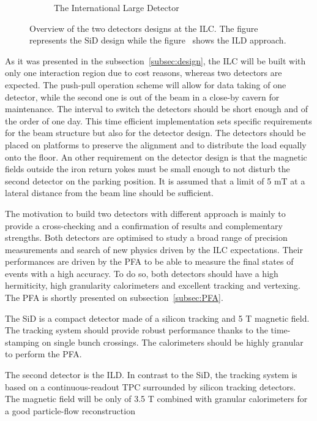\begin{figure}[!h]
\begin{subfigure}[t]{0.5\textwidth}
        \caption{\label{fig:ILD} The International Large Detector}
      \end{subfigure}
      \caption{Overview of the two detectors designs at the ILC. The figure~ represents the SiD design while the figure~ shows the ILD approach.}
      \label{fig:SiD}
    \end{figure}    

  As it was presented in the subsection~\ref{subsec:design}, the \gls{ILC} will be built with only one interaction region due to cost reasons, whereas two detectors are expected.
  The push-pull operation scheme will allow for data taking of one detector, while the second one is out of the beam in a close-by cavern for maintenance.
  The interval to switch the detectors should be short enough and of the order of one day.
  This time efficient implementation sets specific requirements for the beam structure but also for the detector design.
  The detectors should be placed on platforms to preserve the alignment and to distribute the load equally onto the floor.
  An other requirement on the detector design is that the magnetic fields outside the iron return yokes must be small enough to not disturb the second detector on the parking position.
  It is assumed that a limit of 5 mT at a lateral distance from the beam line should be sufficient.

  The motivation to build two detectors with different approach is mainly to provide a cross-checking and a confirmation of results and complementary strengths.
  Both detectors are optimised to study a broad range of precision measurements and search of new physics driven by the \gls{ILC} expectations.
  Their performances are driven by the \gls{PFA} to be able to measure the final states of events with a high accuracy.
  To do so, both detectors should have a high hermiticity, high granularity calorimeters and excellent tracking and vertexing.
  The \gls{PFA} is shortly presented on subsection~\ref{subsec:PFA}.

  The \gls{SiD} is a compact detector made of a silicon tracking and 5 T magnetic field.
  The tracking system should provide robust performance thanks to the time-stamping on single bunch crossings.
  The calorimeters should be highly granular to perform the \gls{PFA}.

  The second detector is the \gls{ILD}.
  In contrast to the \gls{SiD}, the tracking system is based on a continuous-readout \gls{TPC} surrounded by silicon tracking detectors.
  The magnetic field will be only of 3.5 T combined with granular calorimeters for a good particle-flow reconstruction

